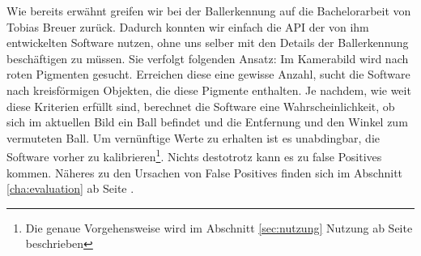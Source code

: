 Wie bereits erwähnt greifen wir bei der Ballerkennung auf die
Bachelorarbeit von Tobias Breuer zurück. Dadurch konnten wir einfach
die API der von ihm entwickelten Software nutzen, ohne uns selber mit
den Details der Ballerkennung beschäftigen zu müssen. Sie verfolgt
folgenden Ansatz: Im Kamerabild wird nach roten Pigmenten
gesucht. Erreichen diese eine gewisse Anzahl, sucht die Software nach
kreisförmigen Objekten, die diese Pigmente enthalten. Je nachdem,
wie weit diese Kriterien erfüllt sind, berechnet die Software eine
Wahrscheinlichkeit, ob sich im aktuellen Bild ein Ball befindet und
die Entfernung und den Winkel zum vermuteten Ball. Um vernünftige
Werte zu erhalten ist es unabdingbar, die Software vorher zu
kalibrieren\footnote{Die genaue Vorgehensweise wird im Abschnitt
\ref{sec:nutzung} Nutzung ab Seite \pageref{sec:nutzung} beschrieben}.  Nichts destotrotz kann es zu false Positives
kommen. Näheres zu den  Ursachen von
False Positives finden sich im Abschnitt \ref{cha:evaluation} ab Seite \pageref{cha:evaluation}.
